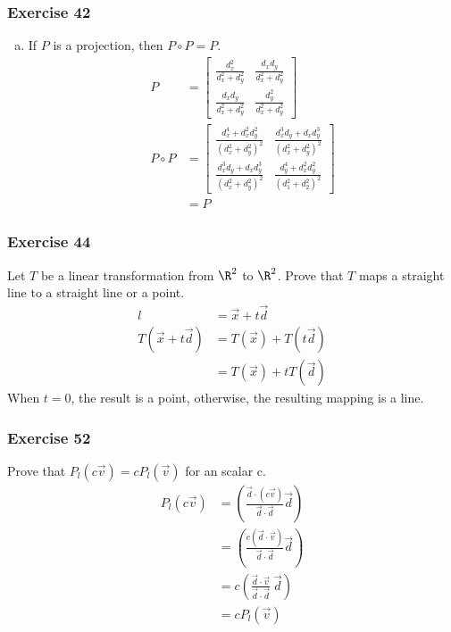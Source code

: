 \documentclass{math}
\begin{document}
\subsubsection*{Exercise 42}
\begin{enumerate}[(a)]
  \item If \( P \) is a projection, then \( P\circ P = P \).
  \begin{align*}
    P &= \begin{bmatrix}
      \frac{d_x^2}{d_x^2+d_y^2} & \frac{d_xd_y}{d_x^2+d_y^2} \\[0.25em]
      \frac{d_xd_y}{d_x^2+d_y^2} & \frac{d_y^2}{d_x^2+d_y^2}
    \end{bmatrix} \\
    P\circ P &= \begin{bmatrix}
      \frac{d_x^4+d_x^2d_y^2}{(d_x^2+d_y^2)^2} &
        \frac{d_x^3d_y+d_xd_y^3}{(d_x^2+d_y^2)^2} \\[0.25em]
      \frac{d_x^3d_y+d_xd_y^3}{(d_x^2+d_y^2)^2} &
        \frac{d_y^4+d_x^2d_y^2}{(d_1^2+d_2^2)^2}
    \end{bmatrix} \\
    &= P
  \end{align*}
\end{enumerate}

\subsubsection*{Exercise 44}
Let \( T \) be a linear transformation from \( \R^2 \) to \( \R^2 \). Prove
that \( T \) maps a straight line to a straight line or a point.
\begin{align*}
  l &= \vec{x}+t\vec{d} \\
  T(\vec{x}+t\vec{d}) &= T(\vec{x})+T(t\vec{d}) \\
  &= T(\vec{x})+tT(\vec{d})
\end{align*}
When \( t = 0 \), the result is a point, otherwise, the resulting mapping is
a line.

\subsubsection*{Exercise 52}
Prove that \( P_l(c\vec{v}) = cP_l(\vec{v}) \) for an scalar c.
\begin{align*}
  P_l(c\vec{v}) &=
    \left(\frac{\vec{d}\cdot(c\vec{v})}{\vec{d}\cdot\vec{d}}\vec{d}\right) \\
  &= \left(\frac{c(\vec{d}\cdot\vec{v})}{\vec{d}\cdot\vec{d}}\vec{d}\right) \\
  &= c\left(\frac{\vec{d}\cdot\vec{v}}{\vec{d}\cdot\vec{d}}~\vec{d}\right) \\
  &= cP_l(\vec{v})
\end{align*}
\end{document}
